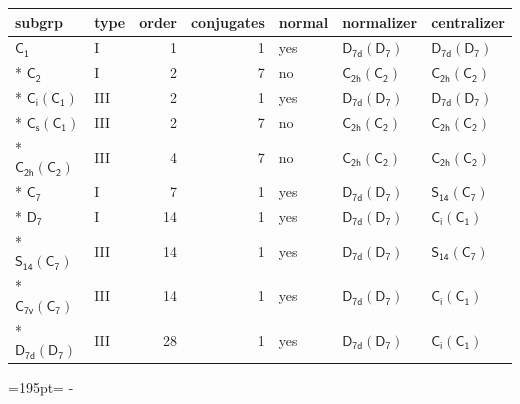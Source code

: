 \documentclass[10pt,a4paper]{article}
\newcommand{\needspace}[1]{\par\penalty-100\begingroup\dimen0=#1\relax\dimen2=\pagegoal
  \advance\dimen2-\pagetotal\ifdim\dimen0>\dimen2\relax\ifdim\dimen2>0pt\vfil\break\fi\fi
  \endgroup}
\numberwithin{equation}{section}
\newcommand{\grp}[1]{\mathsf{#1}}
\begin{document}
{\small\begin{longtable}{@{}llrrlll@{}}\toprule
subgrp & type & order & conjugates & normal & normalizer & centralizer\\\midrule\endhead
\bottomrule\endfoot\endlastfoot
\href{../../../rotation/data/pdf/C1.pdf}{$\grp{C_{1}}$} & I & 1 & 1 & yes & \href{D7d-D7.pdf}{$\grp{D_{7d}}(\grp{D_{7}})$} & \href{D7d-D7.pdf}{$\grp{D_{7d}}(\grp{D_{7}})$}\\*
\href{../../../rotation/data/pdf/C2.pdf}{$\grp{C_{2}}$} & I & 2 & 7 & no & \href{C2h-C2.pdf}{$\grp{C_{2h}}(\grp{C_{2}})$} & \href{C2h-C2.pdf}{$\grp{C_{2h}}(\grp{C_{2}})$}\\*
\href{S2-C1.pdf}{$\grp{C_{i}}(\grp{C_{1}})$} & III & 2 & 1 & yes & \href{D7d-D7.pdf}{$\grp{D_{7d}}(\grp{D_{7}})$} & \href{D7d-D7.pdf}{$\grp{D_{7d}}(\grp{D_{7}})$}\\*
\href{C1v-C1.pdf}{$\grp{C_{s}}(\grp{C_{1}})$} & III & 2 & 7 & no & \href{C2h-C2.pdf}{$\grp{C_{2h}}(\grp{C_{2}})$} & \href{C2h-C2.pdf}{$\grp{C_{2h}}(\grp{C_{2}})$}\\*
\href{C2h-C2.pdf}{$\grp{C_{2h}}(\grp{C_{2}})$} & III & 4 & 7 & no & \href{C2h-C2.pdf}{$\grp{C_{2h}}(\grp{C_{2}})$} & \href{C2h-C2.pdf}{$\grp{C_{2h}}(\grp{C_{2}})$}\\*
\href{../../../rotation/data/pdf/C7.pdf}{$\grp{C_{7}}$} & I & 7 & 1 & yes & \href{D7d-D7.pdf}{$\grp{D_{7d}}(\grp{D_{7}})$} & \href{S14-C7.pdf}{$\grp{S_{14}}(\grp{C_{7}})$}\\*
\href{../../../rotation/data/pdf/D7.pdf}{$\grp{D_{7}}$} & I & 14 & 1 & yes & \href{D7d-D7.pdf}{$\grp{D_{7d}}(\grp{D_{7}})$} & \href{S2-C1.pdf}{$\grp{C_{i}}(\grp{C_{1}})$}\\*
\href{S14-C7.pdf}{$\grp{S_{14}}(\grp{C_{7}})$} & III & 14 & 1 & yes & \href{D7d-D7.pdf}{$\grp{D_{7d}}(\grp{D_{7}})$} & \href{S14-C7.pdf}{$\grp{S_{14}}(\grp{C_{7}})$}\\*
\href{C7v-C7.pdf}{$\grp{C_{7v}}(\grp{C_{7}})$} & III & 14 & 1 & yes & \href{D7d-D7.pdf}{$\grp{D_{7d}}(\grp{D_{7}})$} & \href{S2-C1.pdf}{$\grp{C_{i}}(\grp{C_{1}})$}\\*
\href{D7d-D7.pdf}{$\grp{D_{7d}}(\grp{D_{7}})$} & III & 28 & 1 & yes & \href{D7d-D7.pdf}{$\grp{D_{7d}}(\grp{D_{7}})$} & \href{S2-C1.pdf}{$\grp{C_{i}}(\grp{C_{1}})$}\\
\bottomrule\end{longtable}}
\needspace{195pt}
\end{document}
